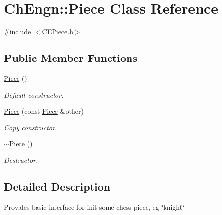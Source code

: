 \hypertarget{classChEngn_1_1Piece}{
\section{ChEngn::Piece Class Reference}
\label{classChEngn_1_1Piece}
}


{\ttfamily \#include $<$CEPiece.h$>$}

\subsection*{Public Member Functions}
\begin{DoxyCompactItemize}
\item 
\hypertarget{classChEngn_1_1Piece_abe7c3a8a7e5ed3beb583a6f6b4df2531}{
\hyperlink{classChEngn_1_1Piece_abe7c3a8a7e5ed3beb583a6f6b4df2531}{Piece} ()}
\label{classChEngn_1_1Piece_abe7c3a8a7e5ed3beb583a6f6b4df2531}

\begin{DoxyCompactList}\small\item\em Default constructor. \item\end{DoxyCompactList}\item 
\hyperlink{classChEngn_1_1Piece_a5abff07a09fc78b6fc805cde2a298b41}{Piece} (const \hyperlink{classChEngn_1_1Piece}{Piece} \&other)
\begin{DoxyCompactList}\small\item\em Copy constructor. \item\end{DoxyCompactList}\item 
\hypertarget{classChEngn_1_1Piece_a75360762004389b1df624136bcaff309}{
\hyperlink{classChEngn_1_1Piece_a75360762004389b1df624136bcaff309}{$\sim$Piece} ()}
\label{classChEngn_1_1Piece_a75360762004389b1df624136bcaff309}

\begin{DoxyCompactList}\small\item\em Destructor. \item\end{DoxyCompactList}\end{DoxyCompactItemize}


\subsection{Detailed Description}
Provides basic interface for init some chess piece, eg \char`\"{}knight\char`\"{} 

